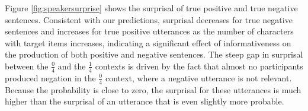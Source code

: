 \documentclass[man, floatsintext, noapacite]{apa6}
\begin{document}



Figure \ref{fig:speakersurprise} shows the surprisal of true positive and true negative sentences.  Consistent with our predictions, surprisal decreases for true negative sentences and increases for true positive utterances as the number of characters with target items increases, indicating a significant effect of informativeness on the production of both positive and negative sentences. The steep gap in surprisal between the $\frac{0}{4}$ and the $\frac{1}{4}$ contexts is driven by the fact that almost no participants produced negation in the $\frac{0}{4}$ context, where a negative utterance is not relevant. Because the probability is close to zero, the surprisal for these utterances is much higher than the surprisal of an utterance that is even slightly more probable. 
\end{document}
